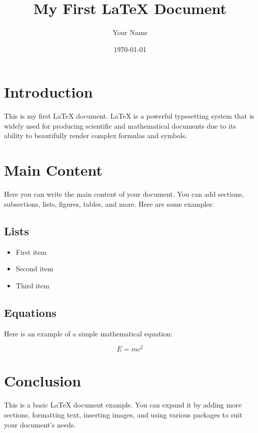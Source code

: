 \documentclass{article} %
\title{My First LaTeX Document} %
\author{Your Name} %
\date{\today} %
\begin{document}
\maketitle %

\section{Introduction}
This is my first LaTeX document. LaTeX is a powerful typesetting system that is widely used for producing scientific and mathematical documents due to its ability to beautifully render complex formulas and symbols.

\section{Main Content}
Here you can write the main content of your document. You can add sections, subsections, lists, figures, tables, and more. Here are some examples:

\subsection{Lists}
\begin{itemize}
    \item First item
    \item Second item
    \item Third item
\end{itemize}

\subsection{Equations}
Here is an example of a simple mathematical equation:

\begin{equation}
    E = mc^2
\end{equation}

\section{Conclusion}
This is a basic LaTeX document example. You can expand it by adding more sections, formatting text, inserting images, and using various packages to suit your document's needs.
\end{document}
